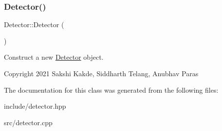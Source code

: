 \subsubsection{\texorpdfstring{Detector()}{Detector()}}
{\footnotesize\ttfamily Detector\+::\+Detector (\begin{DoxyParamCaption}{ }\end{DoxyParamCaption})}



Construct a new \hyperlink{classDetector}{Detector} object. 

Copyright 2021 Sakshi Kakde, Siddharth Telang, Anubhav Paras 

The documentation for this class was generated from the following files\+:\begin{DoxyCompactItemize}
\item 
include/detector.\+hpp\item 
src/detector.\+cpp\end{DoxyCompactItemize}

